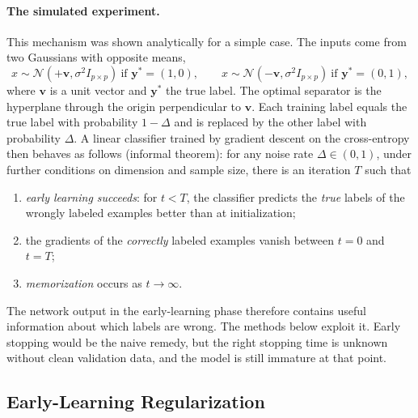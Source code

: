 \paragraph{The simulated experiment.}
This mechanism was shown analytically for a simple case. The inputs come from
two Gaussians with opposite means,
\begin{equation}
  x\sim\mathcal N(+\mathbf v,\sigma^2 I_{p\times p})\ \text{if } \mathbf y^*=(1,0),
  \qquad
  x\sim\mathcal N(-\mathbf v,\sigma^2 I_{p\times p})\ \text{if } \mathbf y^*=(0,1),
\end{equation}
where $\mathbf v$ is a unit vector and $\mathbf y^*$ the true label. The
optimal separator is the hyperplane through the origin perpendicular to
$\mathbf v$. Each training label equals the true label with probability
$1-\Delta$ and is replaced by the other label with probability $\Delta$. A
linear classifier trained by gradient descent on the cross-entropy then
behaves as follows (informal theorem): for any noise rate $\Delta\in(0,1)$,
under further conditions on dimension and sample size, there is an iteration
$T$ such that
\begin{enumerate}
  \item \emph{early learning succeeds}: for $t<T$, the classifier predicts the
    \emph{true} labels of the wrongly labeled examples better than at
    initialization;
  \item the gradients of the \emph{correctly} labeled examples vanish between
    $t=0$ and $t=T$;
  \item \emph{memorization} occurs as $t\to\infty$.
\end{enumerate}
The network output in the early-learning phase therefore contains useful
information about which labels are wrong. The methods below exploit it.
Early stopping would be the naive remedy, but the right stopping time is
unknown without clean validation data, and the model is still immature at
that point.

\subsection{Early-Learning Regularization}

